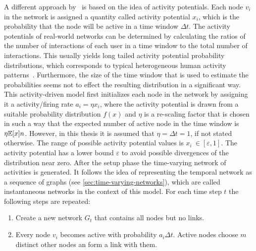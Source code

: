 A different approach by~\citet{Perra2012a} is based on the idea of activity potentials.
Each node \(v_{i}\) in the network is assigned a quantity called activity potential \(x_{i}\), which is the probability that the node will be active in a time window \(\Delta t\).
The activity potentials of real-world networks can be determined by calculating the ratios of the number of interactions of each user in a time window to the total number of interactions.
This usually yields long tailed activity potential probability distributions, which corresponds to typical heterogeneous human activity patterns~\cite{Vazquez2006, Jo2012}.
Furthermore, the size of the time window that is used to estimate the probabilities seems not to effect the resulting distribution in a significant way.
This activity-driven model first initializes each node in the network by assigning it a activity/firing rate \(a_{i} = \eta x_{i}\), where the activity potential is drawn from a suitable probability distribution \( f(x) \) and \( \eta \) is a re-scaling factor that is chosen in such a way that the expected number of active node in the time window is \(\eta \mathbb{E}[{x}] n\).
However, in this thesis it is assumed that \(\eta = \Delta t = 1\), if not stated otherwise.
The range of possible activity potential values is \(x_{i}\ \in [\varepsilon, 1]\).
The activity potential has a lower bound \( \varepsilon \) to avoid possible divergences of the distribution near zero.
After the setup phase the time-varying network of activities is generated.
It follows the idea of representing the temporal network as a sequence of graphs (see \autoref{sec:time-varying-networks}), which are called instantaneous networks in the context of this model.
For each time step \(t\) the following steps are repeated:

\begin{enumerate}
    \item Create a new network \(G_{t}\) that contains all nodes but no links.
    \item Every node \(v_{i}\) becomes active with probability \(a_{i} \Delta t\). Active nodes choose \(m\) distinct other nodes an form a link with them.
\end{enumerate}

